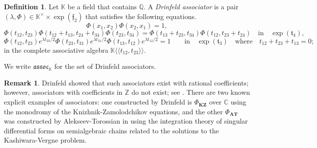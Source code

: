 \documentclass{amsart}
\newcommand{\kk}{\mathbb{K}}    %
\newcommand{\assoc}{\mathfrak{assoc}} %
\newcommand{\ff}{\mathfrak{f}}
\theoremstyle{definition}
\newtheorem{definition}[theorem]{Definition}%
\newtheorem{remark}[theorem]{Remark}%
\numberwithin{equation}{section}
\begin{document}
\begin{definition}\label{def: Drin Ass}
Let $\kk$ be a field that contains $\mathbb{Q}$. A \emph{Drinfeld associator} is a pair $(\lambda,\Phi)\in\kk^{\times}\times \exp(\ff_2)$ that satisfies the following equations. 
\begin{equation}\tag{I}
\Phi(x_1,x_2)\Phi(x_2,x_1)=1,
\end{equation}
\begin{equation}\label{pentagon}\tag{P}
\Phi(t_{12}, t_{23})\Phi(t_{12}+ t_{13}, t_{24}+t_{34})\Phi(t_{23}, t_{34})=\Phi(t_{13} + t_{23}, t_{34})\Phi(t_{12}, t_{23}+ t_{24}) \quad \text{in} \quad \exp({\mathfrak{t}_4}),  
\end{equation}
\begin{equation}\label{hexagon}\tag{H}
\Phi(t_{12}, t_{23})  e^{\lambda t_{23}/2} \Phi(t_{23}, t_{31})  e^{\lambda t_{31}/2}  \Phi(t_{13}, t_{12}) e^{\lambda t_{12}/2} = 1 \qquad \text{in} \quad \exp({\mathfrak{t}_3 }) \quad \text{where} \quad t_{12}+ t_{23}+ t_{13} = 0;
\end{equation} in the complete associative algebra $\kk\langle\langle t_{12},t_{23}\rangle\rangle$.
\end{definition}

We write $\assoc_{\kk}$ for the set of Drinfeld associators.

\begin{remark}
Drinfeld showed that such associators exist with rational coefficients; however, associators with coefficients in $\mathbb{Z}$ do not exist; see \cite[Section 2, Section 5]{Drin}. There are two known explicit examples of associators: one constructed by Drinfeld is $\Phi_{\mathbf{KZ}}$ over $\mathbb{C}$ using the monodromy of the Knizhnik-Zamolodchikov equations, and the other $\Phi_{\mathbf{AT}}$ was constructed by Alekseev-Torossian in \cite{AT_deformations_flat_connections} using the integration theory of singular differential forms on semialgebraic chains related to the solutions to the Kashiwara-Vergne problem.
\end{remark}
\end{document}

